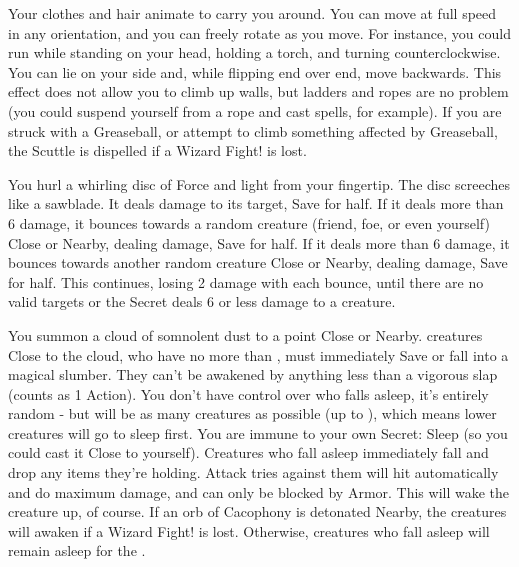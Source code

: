 \WIZARDRY[
  Name=Scuttle,
  Link=secrets-scuttle,
  Alignment=Biomancy,
  Save=N,
  Duration=Combat or \SUMDICE real-world minutes,
  Counter=\mylink{Greaseball}{secrets-greaseball} ,
  Keywords=None,
  Target=Self
]


Your clothes and hair animate to carry you around. You can move at full speed in any orientation, and you can freely rotate as you move. For
instance, you could run while standing on your head, holding a torch, and turning counterclockwise. You can lie on your side and, while flipping end
over end, move backwards. This effect does not allow you to climb up walls, but ladders and ropes are no problem (you could suspend yourself from a rope
and cast spells, for example).  If you are struck with a Greaseball, or attempt to climb something affected by Greaseball, the Scuttle is dispelled if a Wizard Fight! is lost.




\WIZARDRY[
  Name=Scything Disc of Nog,
  Link=secrets-scything-disc-of-nog,
  Alignment=Force,
  Save=Y (half),
  Duration=0,
  Counter=None ,
  Keywords=None,
  Target=Nearby or Far Away Area
]

You hurl a whirling disc of Force and light from your fingertip. The disc screeches like a sawblade. It deals \SUMDICE damage to its target, Save for
half. If it deals more than 6 damage, it bounces towards a random creature (friend, foe, or even yourself) Close or Nearby, dealing 
damage, Save for half. If it deals more than 6 damage, it bounces towards another random creature Close or Nearby, dealing  damage, Save for
half. This continues, losing 2 damage with each bounce, until there are no valid targets or the Secret deals 6 or less damage to a creature.


\WIZARDRY[
  Name=Sleep,
  Link=secrets-sleep,
  Alignment=Mind,
  Save=Y (negate),
  Duration=\DICE,
  Counter=\mylink{Cacophony}{secrets-cacophony} ,
  Keywords=None,
  Target=Close or Nearby Area
]

You summon a cloud of somnolent dust to a point Close or Nearby. \SUMDICE creatures Close to the cloud, who have no more than \DICE {}, must
immediately Save or fall into a magical slumber.   They can't be awakened by anything less than a vigorous slap (counts as 1 Action).  You don't have
control over who falls asleep, it's entirely random - but will be as many creatures as possible (up to \SUMDICE), which means lower \HD creatures will go to sleep first.  You are immune to your own Secret: Sleep (so you could cast it Close to yourself).  Creatures who fall asleep immediately fall  and drop any items they're holding.  Attack tries against them will hit automatically and do maximum damage, and can only be blocked by Armor.  This will wake the creature up, of course.  If an orb of Cacophony is detonated Nearby, the creatures will awaken if a Wizard Fight! is lost.  Otherwise, creatures who fall asleep will remain asleep for the \Duration.  


